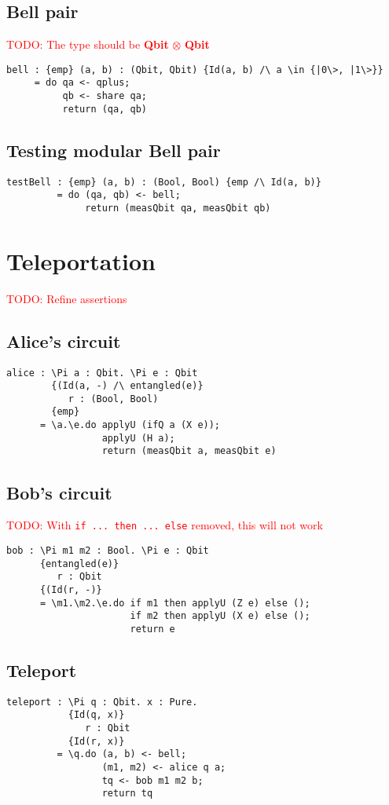 \documentclass[acmsmall,nonacm,timestamp,review=false,anonymous=false]{acmart}
\newcommand{\type}[1]{\textrm{\textbf{#1}}}
\newcommand{\todo}[1]{\textcolor{red}{#1}}
\begin{document}
\subsection{Bell pair}
\todo{TODO: The type should be \type{Qbit} $\otimes$ \type{Qbit}}
\begin{lstlisting}[language=QHaskell]
bell : {emp} (a, b) : (Qbit, Qbit) {Id(a, b) /\ a \in {|0\>, |1\>}}
     = do qa <- qplus;
          qb <- share qa;
          return (qa, qb)
\end{lstlisting}

\subsection{Testing modular Bell pair}
\begin{lstlisting}[language=QHaskell]
testBell : {emp} (a, b) : (Bool, Bool) {emp /\ Id(a, b)}
         = do (qa, qb) <- bell;
              return (measQbit qa, measQbit qb)
\end{lstlisting}

\section{Teleportation}
\label{app:teleport}
\todo{TODO: Refine assertions}
\subsection{Alice's circuit}
\begin{lstlisting}[language=QHaskell]
alice : \Pi a : Qbit. \Pi e : Qbit
        {(Id(a, -) /\ entangled(e)}
           r : (Bool, Bool)
        {emp}
      = \a.\e.do applyU (ifQ a (X e));
                 applyU (H a);
                 return (measQbit a, measQbit e)
\end{lstlisting}

\subsection{Bob's circuit} \todo{TODO: With \texttt{if ... then ... else} removed, this will not work}
\begin{lstlisting}[language=QHaskell]
bob : \Pi m1 m2 : Bool. \Pi e : Qbit
      {entangled(e)}
         r : Qbit
      {(Id(r, -)}
      = \m1.\m2.\e.do if m1 then applyU (Z e) else ();
                      if m2 then applyU (X e) else ();
                      return e
\end{lstlisting}

\subsection{Teleport}
\begin{lstlisting}[language=QHaskell]
teleport : \Pi q : Qbit. x : Pure.
           {Id(q, x)}
              r : Qbit
           {Id(r, x)}
         = \q.do (a, b) <- bell;
                 (m1, m2) <- alice q a;
                 tq <- bob m1 m2 b;
                 return tq
\end{lstlisting}

\end{document}
